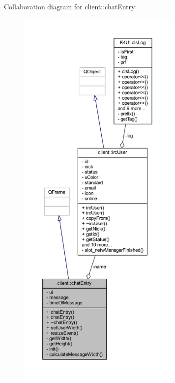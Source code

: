 Collaboration diagram for client\-:\-:chat\-Entry\-:\nopagebreak
\begin{figure}[H]
\begin{center}
\leavevmode
\includegraphics[height=550pt]{da/da6/classclient_1_1chat_entry__coll__graph}
\end{center}
\end{figure}
